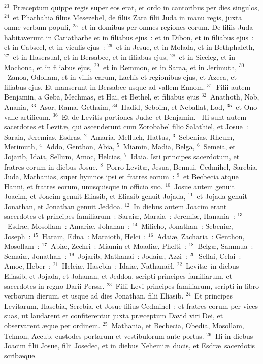 ${}^{23}$~Pr\ae ceptum quippe regis super eos erat, et ordo in cantoribus per dies singulos,
${}^{24}$~et Phathahia filius Mesezebel, de filiis Zara filii Juda in manu regis, juxta omne verbum populi,
${}^{25}$~et in domibus per omnes regiones eorum. De filiis Juda habitaverunt in Cariatharbe et in filiabus ejus~: et in Dibon, et in filiabus ejus~: et in Cabseel, et in viculis ejus~:
${}^{26}$~et in Jesue, et in Molada, et in Bethphaleth,
${}^{27}$~et in Hasersual, et in Bersabee, et in filiabus ejus,
${}^{28}$~et in Siceleg, et in Mochona, et in filiabus ejus,
${}^{29}$~et in Remmon, et in Saraa, et in Jerimuth,
${}^{30}$~Zanoa, Odollam, et in villis earum, Lachis et regionibus ejus, et Azeca, et filiabus ejus. Et manserunt in Bersabee usque ad vallem Ennom.
${}^{31}$~Filii autem Benjamin, a Geba, Mechmas, et Hai, et Bethel, et filiabus ejus 
${}^{32}$~Anathoth, Nob, Anania,
${}^{33}$~Asor, Rama, Gethaim,
${}^{34}$~Hadid, Seboim, et Neballat, Lod,
${}^{35}$~et Ono valle artificum.
${}^{36}$~Et de Levitis portiones Jud\ae\ et Benjamin.
~Hi sunt autem sacerdotes et Levit\ae , qui ascenderunt cum Zorobabel filio Salathiel, et Josue~: Saraia, Jeremias, Esdras,
${}^{2}$~Amaria, Melluch, Hattus,
${}^{3}$~Sebenias, Rheum, Merimuth,
${}^{4}$~Addo, Genthon, Abia,
${}^{5}$~Miamin, Madia, Belga,
${}^{6}$~Semeia, et Jojarib, Idaia, Sellum, Amoc, Helcias,
${}^{7}$~Idaia. Isti principes sacerdotum, et fratres eorum in diebus Josue.
${}^{8}$~Porro Levit\ae , Jesua, Bennui, Cedmihel, Sarebia, Juda, Mathanias, super hymnos ipsi et fratres eorum~:
${}^{9}$~et Becbecia atque Hanni, et fratres eorum, unusquisque in officio suo.
${}^{10}$~Josue autem genuit Joacim, et Joacim genuit Eliasib, et Eliasib genuit Jojada,
${}^{11}$~et Jojada genuit Jonathan, et Jonathan genuit Jeddoa.
${}^{12}$~In diebus autem Joacim erant sacerdotes et principes familiarum~: Sarai\ae , Maraia~: Jeremi\ae , Hanania~:
${}^{13}$~Esdr\ae , Mosollam~: Amari\ae , Johanan~:
${}^{14}$~Milicho, Jonathan~: Sebeni\ae , Joseph~:
${}^{15}$~Haram, Edna~: Maraioth, Helci~:
${}^{16}$~Adai\ae , Zacharia~: Genthon, Mosollam~:
${}^{17}$~Abi\ae , Zechri~: Miamin et Moadi\ae , Phelti~:
${}^{18}$~Belg\ae , Sammua~: Semai\ae , Jonathan~:
${}^{19}$~Jojarib, Mathanai~: Jodai\ae , Azzi~:
${}^{20}$~Sellai, Celai~: Amoc, Heber~:
${}^{21}$~Helci\ae , Hasebia~: Idai\ae , Nathana\"el.
${}^{22}$~Levit\ae\ in diebus Eliasib, et Jojada, et Johanan, et Jeddoa, scripti principes familiarum, et sacerdotes in regno Darii Pers\ae .
${}^{23}$~Filii Levi principes familiarum, scripti in libro verborum dierum, et usque ad dies Jonathan, filii Eliasib.
${}^{24}$~Et principes Levitarum, Hasebia, Serebia, et Josue filius Cedmihel~: et fratres eorum per vices suas, ut laudarent et confiterentur juxta pr\ae ceptum David viri Dei, et observarent \ae que per ordinem.
${}^{25}$~Mathania, et Becbecia, Obedia, Mosollam, Telmon, Accub, custodes portarum et vestibulorum ante portas.
${}^{26}$~Hi in diebus Joacim filii Josue, filii Josedec, et in diebus Nehemi\ae\ ducis, et Esdr\ae\ sacerdotis scrib\ae que.


